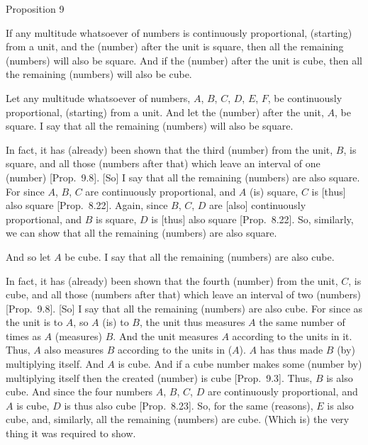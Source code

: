 
\begin{center}
{\large Proposition 9}
\end{center}

If  any multitude whatsoever of numbers is continuously proportional, (starting) from a unit, and the (number) after the
unit is square, then all the remaining (numbers) will also 
be square. And if the (number) after the unit is  cube, then
all the remaining (numbers) will also be cube.

\epsfysize=1.8in
\centerline{}

Let any multitude whatsoever of numbers, $A$, $B$, $C$, $D$, $E$, $F$, be continuously proportional, (starting) from a unit. And let the (number) after the
unit, $A$, be square. I say that all the remaining (numbers)
will also be square.

In fact, it has (already) been shown that the third (number) from the unit, $B$, is
square, and all those (numbers after that) which leave an interval of one (number) [Prop.~9.8]. [So] I say that all the remaining (numbers) are also square. For since $A$, $B$, $C$
are continuously proportional, and $A$ (is)  square, $C$
is [thus] also  square [Prop.~8.22]. Again, 
since $B$, $C$, $D$ are [also] continuously proportional, and $B$ is
 square, $D$ is [thus] also square [Prop.~8.22]. So, similarly,
we can show that all the remaining (numbers) are also square.

And so let $A$ be  cube. I say that all the remaining (numbers)
are also cube.

In fact, it has (already) been shown that the fourth (number) from the unit, $C$, is
cube, and all those (numbers after that) which leave an interval of two (numbers) [Prop.~9.8]. [So] I say
that all the remaining (numbers) are also cube. For since as the
unit is to $A$, so $A$ (is) to $B$, the unit thus measures $A$ the same number of times as $A$ (measures) $B$. And the unit measures $A$ according to the units in it. Thus, $A$ also measures $B$ according to the
units in ($A$).
$A$ has thus made $B$ (by) multiplying itself. 
And $A$ is  cube. And if a cube number makes some (number by)
multiplying itself then the created (number) is cube  [Prop.~9.3]. Thus, $B$ is also cube.
And since the four numbers $A$, $B$, $C$, $D$ are continuously proportional, and $A$ is  cube, $D$ is thus also  cube 
 [Prop.~8.23]. So, for the same (reasons), $E$ is also
 cube, and, similarly, all the remaining (numbers) are cube. (Which is) the very thing it was required to show.

